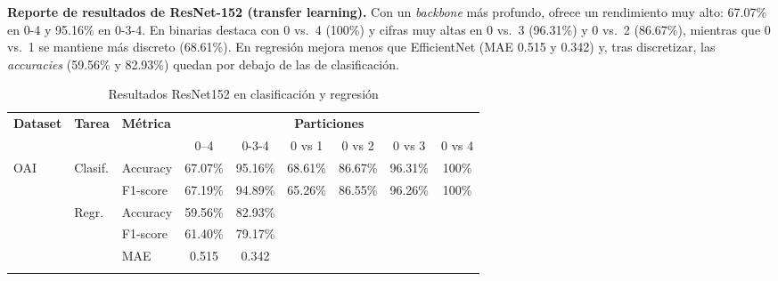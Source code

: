 \documentclass[11pt,spanish,listoffigures,listoftables]{tfgetsinf}
\begin{document}
\noindent\textbf{Reporte de resultados de ResNet-152 (transfer learning).} Con un \emph{backbone} más profundo, ofrece un rendimiento muy alto: 67.07\% en 0-4 y 95.16\% en 0-3-4. En binarias destaca con 0 vs.\ 4 (100\%) y cifras muy altas en 0 vs.\ 3 (96.31\%) y 0 vs.\ 2 (86.67\%), mientras que 0 vs.\ 1 se mantiene más discreto (68.61\%). En regresión mejora menos que EfficientNet (MAE 0.515 y 0.342) y, tras discretizar, las \textit{accuracies} (59.56\% y 82.93\%) quedan por debajo de las de clasificación.


\begin{table}[h]
	\centering
	\caption{Resultados ResNet152 en clasificación y regresión}
	\label{tab:cnn_grande_results}
	\begin{tabular}{@{} l l l c c c c c c @{}}
		\toprule
		\textbf{Dataset} & \textbf{Tarea}                           & \textbf{Métrica}
		                 & \multicolumn{6}{c}{\textbf{Particiones}}                                                                               \\
		\cmidrule(lr){4-9}
		                 &                                          &                  & 0--4    & 0-3-4   & 0 vs 1  & 0 vs 2  & 0 vs 3  & 0 vs 4 \\
		\midrule
		\multirow{2}{*}{OAI}
		                 & Clasif.                                  & Accuracy         & 67.07\% & 95.16\% & 68.61\% & 86.67\% & 96.31\% & 100\%  \\
		                 &                                          & F1-score         & 67.19\% & 94.89\% & 65.26\% & 86.55\% & 96.26\% & 100\%  \\
		\addlinespace
		\multirow{3}{*}{OAI}
		                 & Regr.                                    & Accuracy         & 59.56\% & 82.93\% &         &         &         &        \\
		                 &                                          & F1-score         & 61.40\% & 79.17\% &         &         &         &        \\
		                 &                                          & MAE              & 0.515   & 0.342   &         &         &         &        \\
		\addlinespace
	\end{tabular}
\end{table}

\end{document}
